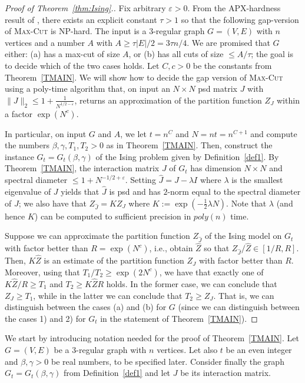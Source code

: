 \documentclass[11pt]{article}
\newcommand{\eps}{\varepsilon}
\begin{document}
\begin{proof}[Proof of Theorem~\ref{thm:Ising}.]
Fix arbitrary $\varepsilon>0$.  From the APX-hardness result of \cite{alimonti1997hardness}, there exists an explicit constant $\tau>1$ so that the following  gap-version of \textsc{Max-Cut} is \mbox{NP-hard}. The input is  a $3$-regular graph $G=(V,E)$ with $n$ vertices and a number $A$ with  $A\geq \tau |E|/2=3\tau n/4$. We are promised that 
$G$ either: (a) has a max-cut of size $A$, or (b) has all cuts of size $\leq A/\tau$; the goal is to decide which of the two cases holds. Let $C,c>0$ be the constants from Theorem~\ref{TMAIN}. We will show how to decide the gap version of \textsc{Max-Cut} using a poly-time algorithm that, on input an $N\times N$ psd matrix $J$ with $\|J\|_2 \leq  1 + \frac{1}{N^{1/2-\varepsilon}}$, returns an approximation of the partition function $Z_J$  within a factor $\exp(N^c)$.

In particular, on input $G$ and $A$, we let $t=n^C$ and $N=nt=n^{C+1}$ and compute the numbers $\beta,\gamma,T_1,T_2>0$ as in Theorem~\ref{TMAIN}. Then,  construct the instance $G_t=G_t(\beta,\gamma)$ of the Ising problem given by Definition~\ref{def1}. By Theorem~\ref{TMAIN}, the interaction matrix $J$ of $G_t$ has dimension $N\times N$ and spectral diameter $\leq 1 + N^{-1/2+\eps}$. Setting $\hat{J}=J-\lambda I$ where $\lambda$ 
is the smallest eigenvalue of $J$ yields that $\hat{J}$ is psd and has $2$-norm equal to the spectral diameter of $J$; we also have that $Z_{\hat{J}}=K Z_J$ where $K:=\exp(-\tfrac{1}{2}\lambda N)$. Note that $\lambda$ (and hence $K$) can be computed to sufficient precision in $poly(n)$ time.

Suppose we can approximate the partition function $Z_{\hat{J}}$ of the Ising model on $G_t$ with factor better than $R=\exp(N^c)$, i.e., obtain $\hat{Z}$ so that   $Z_{\hat{J}}/\hat{Z}\in[1/R,R]$. Then, $K \hat{Z}$ is an estimate of the partition function $Z_J$ with factor better than $R$. Moreover, using that $T_1/T_2\geq \exp(2N^c)$, we have that exactly one of $K \hat{Z}/R\geq T_1$ and $T_2\geq K \hat{Z} R$ holds.  In the former case, we can conclude that $Z_J\geq T_1$, while in the latter we can conclude that $T_2\geq Z_J$. That is, we can distinguish between the cases (a) and (b) 
for $G$ (since we can distinguish between the cases 1) and 2) for $G_t$ in the statement of Theorem~\ref{TMAIN}).
\end{proof}

We start by introducing notation needed for the proof of Theorem~\ref{TMAIN}. Let $G=(V,E)$ be a 3-regular graph with $n$ vertices. Let also $t$ be an even integer and $\beta,\gamma>0$ be real numbers, to be specified later. Consider finally the graph $G_t=G_t(\beta,\gamma)$ from Definition~\ref{def1} and let $J$ be its interaction matrix.
\end{document}
